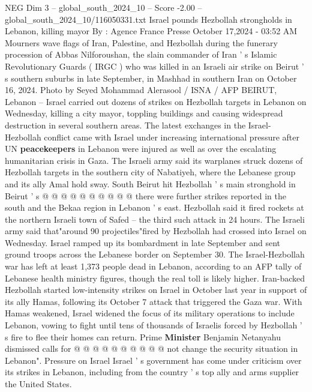 \begin{textsample}{NEG Dim 3 – global\_south\_2024\_10 – Score -2.00 – global\_south\_2024\_10/116050331.txt}  \label{ex:f3_neg_099}
Israel pounds Hezbollah strongholds in Lebanon, killing mayor By : Agence France Presse October 17,2024 - 03:52 AM Mourners wave flags of Iran, Palestine, and Hezbollah during the funerary procession of Abbas Nilforoushan, the slain commander of Iran ' s Islamic Revolutionary Guards ( IRGC ) who was killed in an Israeli air strike on Beirut ' s southern suburbs in late September, in Mashhad in southern Iran on October 16, 2024.
Photo by Seyed Mohammad Alerasool / ISNA / AFP BEIRUT, Lebanon -- Israel carried out dozens of strikes on Hezbollah targets in Lebanon on Wednesday, killing a city mayor, toppling buildings and causing widespread destruction in several southern areas.
The latest exchanges in the Israel-Hezbollah conflict came with Israel under increasing international pressure after UN \textbf{peacekeepers} in Lebanon were injured as well as over the escalating humanitarian crisis in Gaza.
The Israeli army said its warplanes struck dozens of Hezbollah targets in the southern city of Nabatiyeh, where the Lebanese group and its ally Amal hold sway.
South Beirut hit Hezbollah ' s main stronghold in Beirut ' s @ @ @ @ @ @ @ @ @ @ there were further strikes reported in the south and the Bekaa region in Lebanon ' s east.
Hezbollah said it fired rockets at the northern Israeli town of Safed -- the third such attack in 24 hours.
The Israeli army said that"around 90 projectiles"fired by Hezbollah had crossed into Israel on Wednesday.
Israel ramped up its bombardment in late September and sent ground troops across the Lebanese border on September 30.
The Israel-Hezbollah war has left at least 1,373 people dead in Lebanon, according to an AFP tally of Lebanese health ministry figures, though the real toll is likely higher.
Iran-backed Hezbollah started low-intensity strikes on Israel in October last year in support of its ally Hamas, following its October 7 attack that triggered the Gaza war.
With Hamas weakened, Israel widened the focus of its military operations to include Lebanon, vowing to fight until tens of thousands of Israelis forced by Hezbollah ' s fire to flee their homes can return.
Prime \textbf{Minister} Benjamin Netanyahu dismissed calls for @ @ @ @ @ @ @ @ @ @ not change the security situation in Lebanon".
Pressure on Israel Israel ' s government has come under criticism over its strikes in Lebanon, including from the country ' s top ally and arms supplier the United States.

\end{textsample}
